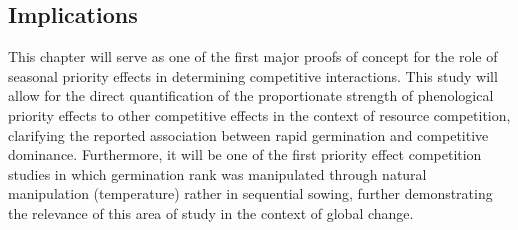 \documentclass[12pt]{article}\usepackage[]{graphicx}\usepackage[]{color}
\begin{document}
\subsection*{Implications}
\indent\indent This chapter will serve as one of the first major proofs of concept for the role of seasonal priority effects in determining competitive interactions. This study will allow for the direct quantification of the proportionate strength of phenological priority effects to other competitive effects in the context of resource competition, clarifying the reported association between rapid germination and competitive dominance. Furthermore, it will be one of the first priority effect competition studies in which germination rank was manipulated through natural manipulation (temperature) rather in sequential sowing, further demonstrating the relevance of this area of study in the context of global change.
\end{document}

